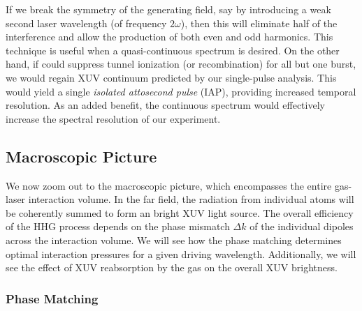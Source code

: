 If we break the symmetry of the generating field, say by introducing a weak second laser wavelength (of frequency $2 \omega$), then this will eliminate half of the interference and allow the production of both even and odd harmonics. This technique is useful when a quasi-continuous spectrum is desired. On the other hand, if could suppress tunnel ionization (or recombination) for all but one burst, we would regain XUV continuum predicted by our single-pulse analysis. This would yield a single \textit{isolated attosecond pulse} (IAP), providing increased temporal resolution. As an added benefit, the continuous spectrum would effectively increase the spectral resolution of our experiment.

\subsection{Macroscopic Picture}

We now zoom out to the macroscopic picture, which encompasses the entire gas-laser interaction volume. In the far field, the radiation from individual atoms will be coherently summed to form an bright XUV light source. The overall efficiency of the HHG process depends on the phase mismatch $\Delta k$ of the individual dipoles across the interaction volume. We will see how the phase matching determines optimal interaction pressures for a given driving wavelength. Additionally, we will see the effect of XUV reabsorption by the gas on the overall XUV brightness.

\subsubsection{Phase Matching}
\label{sec:phase-matching}

